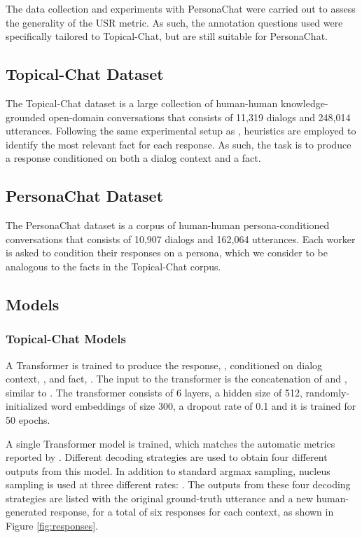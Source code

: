 \documentclass[11pt,a4paper]{article}
\begin{document}
The data collection and experiments with PersonaChat were carried out to assess the generality of the USR metric. As such, the annotation questions used were specifically tailored to Topical-Chat, but are still suitable for PersonaChat.

\subsection{Topical-Chat Dataset}

The Topical-Chat dataset \citep{gopalakrishnan2019topical} is a large collection of human-human knowledge-grounded open-domain conversations that consists of 11,319 dialogs and 248,014 utterances. Following the same experimental setup as \citet{gopalakrishnan2019topical}, heuristics are employed to identify the most relevant fact for each response. As such, the task is to produce a response conditioned on both a dialog context and a fact. 

\subsection{PersonaChat Dataset}

The PersonaChat dataset \citep{zhang2018personalizing} is a corpus of human-human persona-conditioned conversations that consists of 10,907 dialogs and 162,064 utterances. Each worker is asked to condition their responses on a persona, which we consider to be analogous to the facts in the Topical-Chat corpus.


\subsection{Models}
\label{models}

\subsubsection{Topical-Chat Models}

A Transformer \citep{vaswani2017attention} is trained to produce the response, , conditioned on dialog context, , and fact, . The input to the transformer is the concatenation of  and , similar to \citet{gopalakrishnan2019topical}. The transformer consists of 6 layers, a hidden size of 512, randomly-initialized word embeddings of size 300, a dropout rate of 0.1 and it is trained for 50 epochs.

A single Transformer model is trained, which matches the automatic metrics reported by \citet{gopalakrishnan2019topical}. Different decoding strategies are used to obtain four different outputs from this model. In addition to standard argmax sampling, nucleus sampling \citep{holtzman2019curious} is used at three different rates: . The outputs from these four decoding strategies are listed with the original ground-truth utterance and a new human-generated response, for a total of six responses for each context, as shown in Figure \ref{fig:responses}. 
\end{document}
